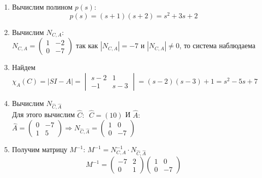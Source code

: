 \documentclass[../../TAU.tex]{subfiles}
\begin{document}
    \begin{enumerate}
        \item Вычислим полином $p(s)$:
            $$p(s)=(s+1)(s+2)=s^2+3s+2$$
        \item Вычислим $N_{C, A}$:\\
            $
                N_{C, A} =
                \begin{pmatrix}
                 1 & -2\\
                 0 & -7
                \end{pmatrix} 
            $
            так как $|N_{C, A}|=-7$ и $|N_{C, A}|\neq0$, то система наблюдаема
        \item Найдем 
        $
            \chi_A(C)=|SI-A|=
            \begin{vmatrix}
                s-2 & 1\\
                -1 & s-3
            \end{vmatrix}
            =(s-2)(s-3)+1=s^2-5s+7
        $
        \item Вычислим $N_{\widehat C,\widehat A}$\\
            Для этого вычислим $\widehat C:$\ \quad$\widehat C=(10)$
            И $\widehat A:$\\
            $
                \widehat A=
                \begin{pmatrix}
                    0 & -7\\
                    1 & 5
                \end{pmatrix}
                \Rightarrow
                N_{\widehat C,\widehat A} =
                \begin{pmatrix}
                    1 & 0\\
                    0 & -7
                \end{pmatrix}
            $ 
        \item Получим матрицу $M^{-1}$: $M^{-1}=N_{C, A}^{-1}\cdot N_{\widehat C, \widehat A}$\\
            $$
                M^{-1}=
                \begin{pmatrix}
                    -7 & 2\\
                    0 & 1
                \end{pmatrix}
                \begin{pmatrix}
                    1 & 0\\
                    0 & -7
                \end{pmatrix}
$$
\end{enumerate}
\end{document}
